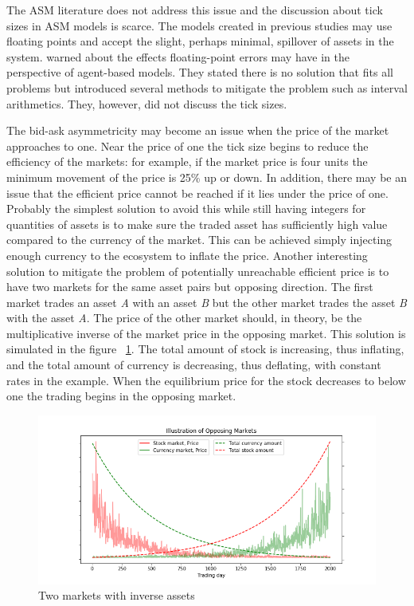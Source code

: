 The ASM literature does not address this issue and the discussion about 
tick sizes in ASM models is scarce. The models created in previous studies 
may use floating points and accept the slight, perhaps minimal, spillover 
of assets in the system. \citet{FloatingPoint06} warned about the effects 
floating-point errors may have in the perspective of agent-based models. 
They stated there is no solution that fits all problems but introduced 
several methods to mitigate the problem such as interval arithmetics. They, 
however, did not discuss the tick sizes.

The bid-ask asymmetricity may become an issue when the price of the market
approaches to one. Near the price of one the tick size begins to reduce the efficiency
of the markets: for example, if the market price is four units the minimum movement 
of the price is 25\% up or down. In addition, there may be an issue that the efficient
price cannot be reached if it lies under the price of one. Probably
the simplest solution to avoid this while still having integers for quantities 
of assets is to make sure the traded asset has sufficiently high value
compared to the currency of the market. This can be achieved simply injecting
enough currency to the ecosystem to inflate the price. Another interesting 
solution to mitigate the problem of potentially unreachable efficient price 
is to have two markets for the same asset pairs but opposing direction. 
The first market trades an asset \textit{A} with an asset \textit{B} but the 
other market trades the asset \textit{B} with the asset \textit{A}. 
The price of the other market should, in theory, be the multiplicative inverse of 
the market price in the opposing market. This solution is simulated in the figure 
~\ref{fig:opposing_markets}. The total amount of stock is increasing, 
thus inflating, and the total amount of currency is decreasing, thus deflating, 
with constant rates in the example. When the equilibrium price for the stock 
decreases to below one the trading begins in the opposing market. 



\begin{figure}[H]
    \includegraphics[width=\linewidth]{plots/opposing_markets.png}
    \caption{Two markets with inverse assets}
    \label{fig:opposing_markets}
\end{figure}



